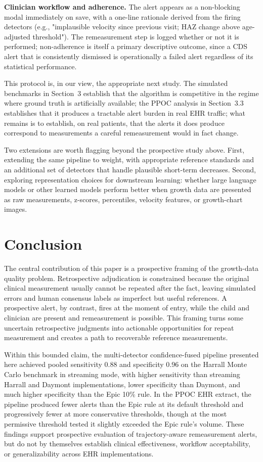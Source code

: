 \documentclass[11pt]{article}
\begin{document}
\textbf{Clinician workflow and adherence.} The alert appears as a non-blocking modal immediately on save, with a one-line rationale derived from the firing detectors (e.g., "implausible velocity since previous visit; HAZ change above age-adjusted threshold"). The remeasurement step is logged whether or not it is performed; non-adherence is itself a primary descriptive outcome, since a CDS alert that is consistently dismissed is operationally a failed alert regardless of its statistical performance.

This protocol is, in our view, the appropriate next study. The simulated benchmarks in Section~3 establish that the algorithm is competitive in the regime where ground truth is artificially available; the PPOC analysis in Section~3.3 establishes that it produces a tractable alert burden in real EHR traffic; what remains is to establish, on real patients, that the alerts it does produce correspond to measurements a careful remeasurement would in fact change.

Two extensions are worth flagging beyond the prospective study above. First, extending the same pipeline to weight, with appropriate reference standards and an additional set of detectors that handle plausible short-term decreases. Second, exploring representation choices for downstream learning: whether large language models or other learned models perform better when growth data are presented as raw measurements, z-scores, percentiles, velocity features, or growth-chart images.

\section{Conclusion}\label{conclusion}

The central contribution of this paper is a prospective framing of the growth-data quality problem. Retrospective adjudication is constrained because the original clinical measurement usually cannot be repeated after the fact, leaving simulated errors and human consensus labels as imperfect but useful references. A prospective alert, by contrast, fires at the moment of entry, while the child and clinician are present and remeasurement is possible. This framing turns some uncertain retrospective judgments into actionable opportunities for repeat measurement and creates a path to recoverable reference measurements.

Within this bounded claim, the multi-detector confidence-fused pipeline presented here achieved pooled sensitivity 0.88 and specificity 0.96 on the Harrall Monte Carlo benchmark in streaming mode, with higher sensitivity than streaming Harrall and Daymont implementations, lower specificity than Daymont, and much higher specificity than the Epic 10\% rule. In the PPOC EHR extract, the pipeline produced fewer alerts than the Epic rule at its default threshold and progressively fewer at more conservative thresholds, though at the most permissive threshold tested it slightly exceeded the Epic rule's volume. These findings support prospective evaluation of trajectory-aware remeasurement alerts, but do not by themselves establish clinical effectiveness, workflow acceptability, or generalizability across EHR implementations.
\end{document}
